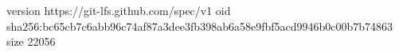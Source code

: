 version https://git-lfs.github.com/spec/v1
oid sha256:bc65cb7c6abb96c74af87a3dee3fb398ab6a58e9fbf5acd9946b0c00b7b74863
size 22056

